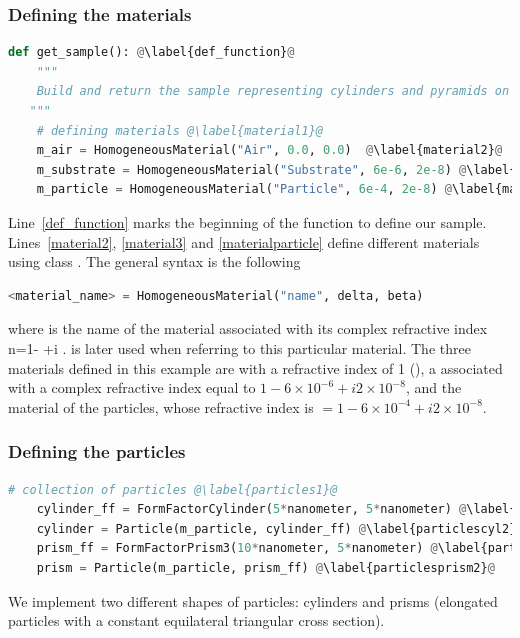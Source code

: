 \subsubsection{Defining the materials}

\begin{lstlisting}[language=python, style=eclipseboxed,name=ex1,nolol]
def get_sample(): @\label{def_function}@
    """
    Build and return the sample representing cylinders and pyramids on top of substrate without interference.
   """
    # defining materials @\label{material1}@
    m_air = HomogeneousMaterial("Air", 0.0, 0.0)  @\label{material2}@
    m_substrate = HomogeneousMaterial("Substrate", 6e-6, 2e-8) @\label{material3}@
    m_particle = HomogeneousMaterial("Particle", 6e-4, 2e-8) @\label{materialparticle}@

\end{lstlisting}
Line~\ref{def_function} marks the beginning of the
function to define our sample. Lines~\ref{material2}, \ref{material3} and \ref{materialparticle} define different
materials using class . The general syntax is the following
\begin{lstlisting}[language=python, style=eclipse,numbers=none]
<material_name> = HomogeneousMaterial("name", delta, beta)
\end{lstlisting}
where  is the name of the
material associated with its complex refractive index
n=1- +i .  is later used when
referring to this particular material. The three materials defined in this example are  with a refractive
index of 1 (), a  associated with a complex refractive index
equal to $1-6\times 10^{-6} +i2\times 10^{-8} $, and the material of the particles, whose refractive index is $=1-6\times 10^{-4}+i2\times 10^{-8}$.

\subsubsection{Defining the particles}
\begin{lstlisting}[language=python,style=eclipseboxed,name=ex1,nolol]
    # collection of particles @\label{particles1}@
    cylinder_ff = FormFactorCylinder(5*nanometer, 5*nanometer) @\label{particlescyl1}@
    cylinder = Particle(m_particle, cylinder_ff) @\label{particlescyl2}@
    prism_ff = FormFactorPrism3(10*nanometer, 5*nanometer) @\label{particlesprism1}@
    prism = Particle(m_particle, prism_ff) @\label{particlesprism2}@
\end{lstlisting}
We implement two different shapes of particles: cylinders and
prisms (\idest  elongated particles with a constant equilateral triangular cross section).

